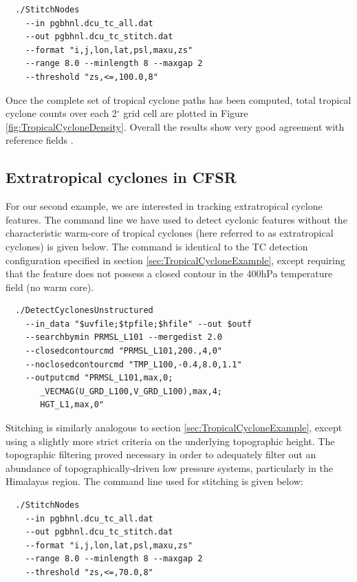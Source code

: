 \documentclass[gmdd, hvmath, online]{copernicus_discussions}
\begin{document}
{\small \begin{verbatim}
  ./StitchNodes
    --in pgbhnl.dcu_tc_all.dat
    --out pgbhnl.dcu_tc_stitch.dat
    --format "i,j,lon,lat,psl,maxu,zs"
    --range 8.0 --minlength 8 --maxgap 2
    --threshold "zs,<=,100.0,8"
\end{verbatim}}

Once the complete set of tropical cyclone paths has been computed, total tropical cyclone counts over each 2$^\circ$ grid cell are plotted in Figure \ref{fig:TropicalCycloneDensity}.  Overall the results show very good agreement with reference fields \citep{Gray1968,Knapp2010}.

\subsection{Extratropical cyclones in CFSR} \label{sec:ExtratropicalCycloneExample}

For our second example, we are interested in tracking extratropical cyclone features.  The command line we have used to detect cyclonic features without the characteristic warm-core of tropical cyclones (here referred to as extratropical cyclones) is given below.  The command is identical to the TC detection configuration specified in section \ref{sec:TropicalCycloneExample}, except requiring that the feature does not possess a closed contour in the 400hPa temperature field (no warm core).

{\small \begin{verbatim}
  ./DetectCyclonesUnstructured
    --in_data "$uvfile;$tpfile;$hfile" --out $outf
    --searchbymin PRMSL_L101 --mergedist 2.0
    --closedcontourcmd "PRMSL_L101,200.,4,0"
    --noclosedcontourcmd "TMP_L100,-0.4,8.0,1.1"
    --outputcmd "PRMSL_L101,max,0;
       _VECMAG(U_GRD_L100,V_GRD_L100),max,4;
       HGT_L1,max,0"
\end{verbatim}}

Stitching is similarly analogous to section \ref{sec:TropicalCycloneExample}, except using a slightly more strict criteria on the underlying topographic height.  The topographic filtering proved necessary in order to adequately filter out an abundance of topographically-driven low pressure systems, particularly in the Himalayas region.  The command line used for stitching is given below:

{\small \begin{verbatim}
  ./StitchNodes
    --in pgbhnl.dcu_tc_all.dat
    --out pgbhnl.dcu_tc_stitch.dat
    --format "i,j,lon,lat,psl,maxu,zs"
    --range 8.0 --minlength 8 --maxgap 2
    --threshold "zs,<=,70.0,8"
\end{verbatim}}
\end{document}
